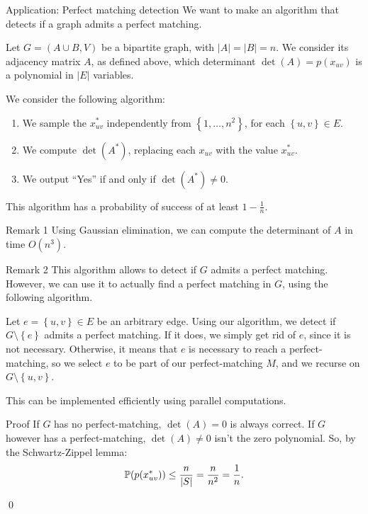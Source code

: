\documentclass[a4paper]{article}
\begin{document}
\begin{parag}{Application: Perfect matching detection}
    We want to make an algorithm that detects if a graph admits a perfect matching.

    Let $G = \left(A \cup B, V\right)$ be a bipartite graph, with $\left|A\right| = \left|B\right| = n$. We consider its adjacency matrix $A$, as defined above, which determinant $\det\left(A\right) = p\left(x_{uv}\right)$ is a polynomial in $\left|E\right|$ variables.

    We consider the following algorithm:
    \begin{enumerate}
        \item We sample the $x_{uv}^*$ independently from $\left\{1, \ldots, n^2\right\}$, for each $\left\{u, v\right\} \in E$. 
        \item We compute $\det\left(A^*\right)$, replacing each $x_{uv}$ with the value $x^*_{uv}$.
        \item We output ``Yes'' if and only if $\det\left(A^*\right) \neq 0$.
    \end{enumerate}
    
    This algorithm has a probability of success of at least $1 - \frac{1}{n}$.

    \begin{subparag}{Remark 1}
        Using Gaussian elimination, we can compute the determinant of $A$ in time $O\left(n^3\right)$.
    \end{subparag}

    \begin{subparag}{Remark 2}
        This algorithm allows to detect if $G$ admits a perfect matching. However, we can use it to actually find a perfect matching in $G$, using the following algorithm.

        Let $e = \left\{u, v\right\} \in E$ be an arbitrary edge. Using our algorithm, we detect if $G \setminus \left\{e\right\}$ admits a perfect matching. If it does, we simply get rid of $e$, since it is not necessary. Otherwise, it means that $e$ is necessary to reach a perfect-matching, so we select $e$ to be part of our perfect-matching $M$, and we recurse on $G \setminus \left\{u, v\right\}$.

        This can be implemented efficiently using parallel computations.
    \end{subparag}

    \begin{subparag}{Proof}
        If $G$ has no perfect-matching, $\det\left(A\right) = 0$ is always correct.  If $G$ however has a perfect-matching, $\det\left(A\right) \neq 0$ isn't the zero polynomial. So, by the Schwartz-Zippel lemma: 
        \[\prob\left(p\left(x_{uv}^*\right)\right) \leq \frac{n}{\left|S\right|} = \frac{n}{n^2} = \frac{1}{n}.\]

        \qed
    \end{subparag}
\end{parag}
\end{document}
